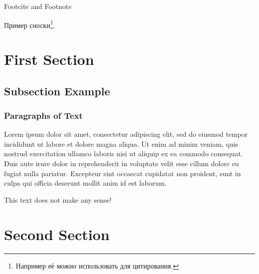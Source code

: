 \documentclass[aspectratio=169]{beamer}
\begin{document}







\begin{frame}{Footcite and Footnote}

Пример сноски\footnote{Например её можно использовать для цитирования.}.

\end{frame}



\section{First Section}

\subsection{Subsection Example}

\begin{frame}
\frametitle{Paragraphs of Text}
Lorem ipsum dolor sit amet, consectetur adipiscing elit, sed do eiusmod tempor incididunt ut labore et dolore magna aliqua. Ut enim ad minim veniam, quis nostrud exercitation ullamco laboris nisi ut aliquip ex ea commodo consequat. Duis aute irure dolor in reprehenderit in voluptate velit esse cillum dolore eu fugiat nulla pariatur. Excepteur sint occaecat cupidatat non proident, sunt in culpa qui officia deserunt mollit anim id est laborum.

\alert{This text does not make any sense!}

\end{frame}


\section{Second Section}
\end{document}

